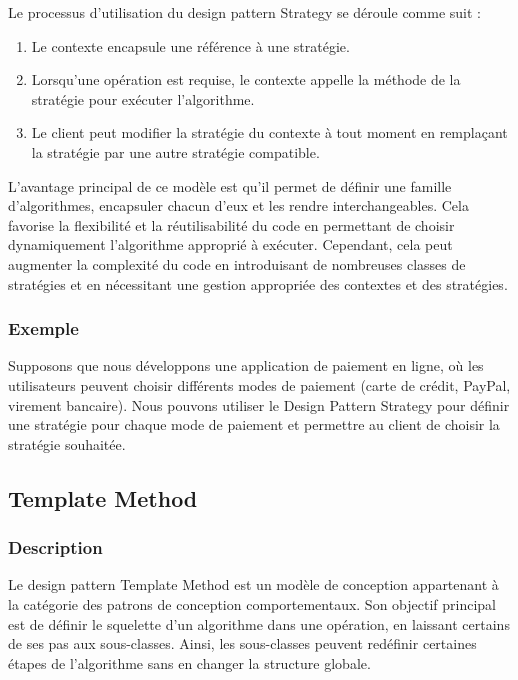 \documentclass[french]{article}
\begin{document}
Le processus d'utilisation du design pattern Strategy se déroule comme suit :

\begin{enumerate}
    \item Le contexte encapsule une référence à une stratégie.
    \item Lorsqu'une opération est requise, le contexte appelle la méthode de la stratégie pour exécuter l'algorithme.
    \item Le client peut modifier la stratégie du contexte à tout moment en remplaçant la stratégie par une autre stratégie compatible.
\end{enumerate}

L'avantage principal de ce modèle est qu'il permet de définir une famille d'algorithmes, encapsuler chacun d'eux et les rendre interchangeables. Cela favorise la flexibilité et la réutilisabilité du code en permettant de choisir dynamiquement l'algorithme approprié à exécuter. Cependant, cela peut augmenter la complexité du code en introduisant de nombreuses classes de stratégies et en nécessitant une gestion appropriée des contextes et des stratégies.


\subsubsection{Exemple}

Supposons que nous développons une application de paiement en ligne, où les utilisateurs peuvent choisir différents modes de paiement (carte de crédit, PayPal, virement bancaire). Nous pouvons utiliser le Design Pattern Strategy pour définir une stratégie pour chaque mode de paiement et permettre au client de choisir la stratégie souhaitée.




\newpage

\subsection{Template Method}

\subsubsection{Description}

Le design pattern Template Method est un modèle de conception appartenant à la catégorie des patrons de conception comportementaux. Son objectif principal est de définir le squelette d'un algorithme dans une opération, en laissant certains de ses pas aux sous-classes. Ainsi, les sous-classes peuvent redéfinir certaines étapes de l'algorithme sans en changer la structure globale.
\end{document}
